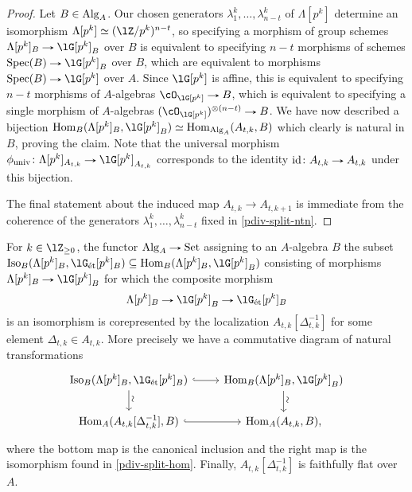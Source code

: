 \begin{proof}
  Let $B \in \mathrm{Alg}_A$. Our chosen generators
  $\lambda^k_1, \ldots, \lambda^k_{n-t}$ of $\Lambda[p^k]$ determine
  an isomorphism $\Lambda[p^k] \iso (\lZ/p^k)^{n-t}$, so specifying a
  morphism of group schemes $\Lambda[p^k]_B \to \lG[p^k]_B$ over $B$
  is equivalent to specifying $n-t$ morphisms of schemes
  $\Spec(B) \to \lG[p^k]_B$ over $B$, which are equivalent to
  morphisms $\Spec(B) \to \lG[p^k]$ over $A$. Since $\lG[p^k]$ is
  affine, this is equivalent to specifying $n-t$ morphisms of
  $A$-algebras $\cO_{\lG[p^k]} \to B$, which is equivalent to
  specifying a single morphism of $A$-algebras
  $(\cO_{\lG[p^k]})^{\otimes(n-t)} \to B$. We have now described a
  bijection
  $\Hom_B(\Lambda[p^k]_B, \lG[p^k]_B) \iso \Hom_{\Alg_A}(A_{t,k},B)$
  which clearly is natural in $B$, proving the claim. Note that the
  universal morphism
  $\phi_\univ \c \Lambda[p^k]_{A_{t,k}} \to \lG[p^k]_{A_{t,k}}$
  corresponds to the identity $\id \c A_{t,k} \to A_{t,k}$ under this
  bijection.

  The final statement about the induced map $A_{t,k} \to A_{t,k+1}$ is
  immediate from the coherence of the generators $\lambda^k_1, \ldots,
  \lambda^k_{n-t}$ fixed in \cref{pdiv-split-ntn}.
\end{proof}

\begin{lemma}
  \label{pdiv-split-iso}
  For $k \in \lZ_{\ge 0}$, the functor $\Alg_A \to \Set$ assigning to
  an $A$-algebra $B$ the subset
  $\Iso_B(\Lambda[p^k]_B, \lG_\et[p^k]_B) \subseteq
  \Hom_B(\Lambda[p^k]_B, \lG[p^k]_B)$
  consisting of morphisms $\Lambda[p^k]_B \to \lG[p^k]_B$ for which
  the composite morphism
  \[
  \Lambda[p^k]_B \to \lG[p^k]_B \to \lG_\et[p^k]_B
  \]
  is an isomorphism is corepresented by the localization
  $A_{t,k}[\Delta_{t,k}^{-1}]$ for some element
  $\Delta_{t,k} \in A_{t,k}$. More precisely we have a commutative
  diagram of natural transformations
  \begin{equation}
    \label{pdiv-split-iso-dgm}
    \begin{tikzcd}
      \Iso_B(\Lambda[p^k]_B, \lG_\et[p^k]_B) \ar[r, hook]
      \ar[d, "\sim"{rotate=90, yshift=-4pt, xshift=-4pt}] &
      \Hom_B(\Lambda[p^k]_B, \lG[p^k]_B)
      \ar[d, "\sim"{rotate=90, yshift=-4pt, xshift=-4pt}] \\
      \Hom_A(A_{t,k}[\Delta^{-1}_{t,k}],B) \ar[r, hook] &
      \Hom_A(A_{t,k},B),
    \end{tikzcd}
  \end{equation}
  where the bottom map is the canonical inclusion and the right map is
  the isomorphism found in \cref{pdiv-split-hom}. Finally,
  $A_{t,k}[\Delta^{-1}_{t,k}]$ is faithfully flat over $A$.
\end{lemma}

